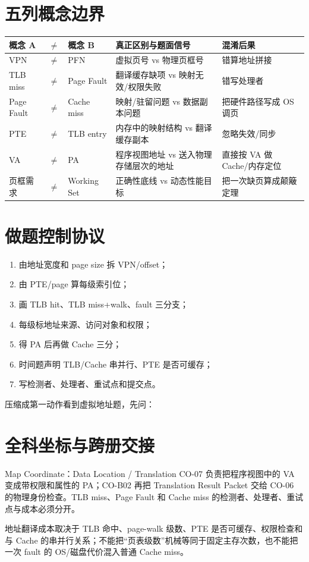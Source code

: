 \documentclass[UTF8,fontset=fandol,11pt,a4paper]{ctexart}
\begin{document}
\section{五列概念边界}
\begin{center}\small\begin{tabularx}{\linewidth}{L{1.8cm}C{0.35cm}L{1.8cm}Y Y}\toprule
概念 A & $\neq$ & 概念 B & 真正区别与题面信号 & 混淆后果\\\midrule
VPN & $\neq$ & PFN & 虚拟页号 vs 物理页框号 & 错算地址拼接\\
TLB miss & $\neq$ & Page Fault & 翻译缓存缺项 vs 映射无效/权限失败 & 错写处理者\\
Page Fault & $\neq$ & Cache miss & 映射/驻留问题 vs 数据副本问题 & 把硬件路径写成 OS 调页\\
PTE & $\neq$ & TLB entry & 内存中的映射结构 vs 翻译缓存副本 & 忽略失效/同步\\
VA & $\neq$ & PA & 程序视图地址 vs 送入物理存储层次的地址 & 直接按 VA 做 Cache/内存定位\\
页框需求 & $\neq$ & Working Set & 正确性底线 vs 动态性能目标 & 把一次缺页算成颠簸定理\\
\bottomrule\end{tabularx}\end{center}

\section{做题控制协议}
\begin{enumerate}\item 由地址宽度和 page size 拆 VPN/offset；\item 由 PTE/page 算每级索引位；\item 画 TLB hit、TLB miss+walk、fault 三分支；\item 每级标地址来源、访问对象和权限；\item 得 PA 后再做 Cache 三分；\item 时间题声明 TLB/Cache 串并行、PTE 是否可缓存；\item 写检测者、处理者、重试点和提交点。\end{enumerate}
\begin{methodbox}{压缩成第一动作}看到虚拟地址题，先问：\end{methodbox}

\section{全科坐标与跨册交接}
\begin{corebox}{Map Coordinate：Data Location / Translation}
CO-07 负责把程序视图中的 VA 变成带权限和属性的 PA；CO-B02 再把 Translation Result Packet 交给 CO-06 的物理身份检查。TLB miss、Page Fault 和 Cache miss 的检测者、处理者、重试点与成本必须分开。
\end{corebox}
地址翻译成本取决于 TLB 命中、page-walk 级数、PTE 是否可缓存、权限检查和与 Cache 的串并行关系；不能把“页表级数”机械等同于固定主存次数，也不能把一次 fault 的 OS/磁盘代价混入普通 Cache miss。
\end{document}
